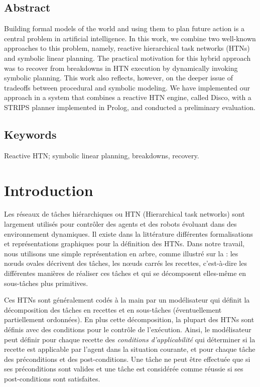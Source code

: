 \documentclass[a4paper,twoside,french]{article}
\begin{document}
				\subsection*{Abstract}
				Building formal models of the world and using them to plan future
				action is a central problem in artificial intelligence.  In this
				work, we combine two well-known approaches to this problem, namely,
				reactive hierarchical task networks (HTNs) and symbolic linear
				planning.  The practical motivation for this hybrid approach was to
				recover from breakdowns in HTN execution by dynamically invoking
				symbolic planning.  This work also reflects, however, on the deeper
				issue of tradeoffs between procedural and symbolic modeling.  We
				have implemented our approach in a system that combines a reactive
				HTN engine, called Disco, with a STRIPS planner implemented in
				Prolog, and conducted a preliminary evaluation.
				\subsection*{Keywords}
				Reactive HTN; symbolic linear planning, breakdowns, recovery.
				
				
				\section{Introduction}
				Les r\'eseaux de t\^aches hi\'erarchiques ou HTN \cite{erol1994htn} (Hierarchical task networks) sont largement utilis\'es pour contr\^oler des agents et des robots \'evoluant dans des environnement dynamiques. Il existe dans la litt\'erature diff\'erentes formalisations et repr\'esentations graphiques pour la d\'efinition des HTNs. Dans notre travail, nous utilisons une simple repr\'esentation en arbre, comme illustré sur la : les n\oe{}uds ovales décrivent des tâches, les n\oe{}uds carrés les recettes, c'est-à-dire les différentes manières de réaliser ces tâches et qui se décomposent elles-même en sous-tâches plus primitives.

				\par Ces HTNs sont g\'en\'eralement cod\'es \`a la main par un modélisateur qui définit la décomposition des tâches en recettes et en sous-tâches (éventuellement partiellement ordonn\'ees). En plus cette d\'ecomposition, la plupart des HTNs sont d\'efinis avec des conditions pour le contrôle de l'exécution. Ainsi, le modélisateur peut définir pour chaque recette des \emph{conditions d'applicabilité} qui déterminer si la recette est applicable par l'agent dans la situation courante, et pour chaque tâche des pr\'econditions et des post-conditions. Une tâche ne peut être effectuée que si ses préconditions sont valides et une tâche est considérée comme réussie si ses post-conditions sont satisfaites.
								
\end{document}
